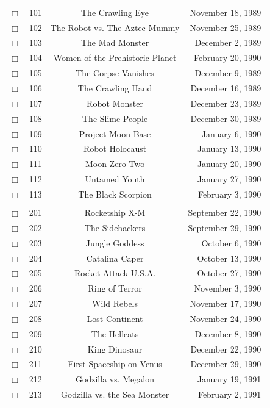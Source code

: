 \documentclass[12pt]{article}
\begin{document}
\begin{center}
\begin{longtable}[c]{cccr}
\\  %
$\Box$&101&The Crawling Eye&November 18, 1989\\
$\Box$&102&The Robot vs. The Aztec Mummy&November 25, 1989\\
$\Box$&103&The Mad Monster&December  2, 1989\\
$\Box$&104&Women of the Prehistoric Planet&February 20, 1990\\
$\Box$&105&The Corpse Vanishes&December  9, 1989\\
$\Box$&106&The Crawling Hand&December 16, 1989\\
$\Box$&107&Robot Monster&December 23, 1989\\
$\Box$&108&The Slime People&December 30, 1989\\
$\Box$&109&Project Moon Base&January  6, 1990\\
$\Box$&110&Robot Holocaust&January 13, 1990\\
$\Box$&111&Moon Zero Two&January 20, 1990\\
$\Box$&112&Untamed Youth&January 27, 1990\\
$\Box$&113&The Black Scorpion&February  3, 1990\\  %

\\  %
$\Box$&201&Rocketship X-M&September 22, 1990\\
$\Box$&202&The Sidehackers&September 29, 1990\\
$\Box$&203&Jungle Goddess&October  6, 1990\\
$\Box$&204&Catalina Caper&October 13, 1990\\
$\Box$&205&Rocket Attack U.S.A.&October 27, 1990\\
$\Box$&206&Ring of Terror&November  3, 1990\\
$\Box$&207&Wild Rebels&November 17, 1990\\
$\Box$&208&Lost Continent&November 24, 1990\\
$\Box$&209&The Hellcats&December  8, 1990\\
$\Box$&210&King Dinosaur&December 22, 1990\\
$\Box$&211&First Spaceship on Venus&December 29, 1990\\
$\Box$&212&Godzilla vs. Megalon&January 19, 1991\\
$\Box$&213&Godzilla vs. the Sea Monster&February  2, 1991\\  %


\end{longtable}
\end{center}
\end{document}
